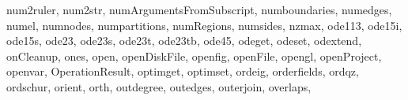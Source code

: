 {{        num2ruler,%
        num2str,%
        numArgumentsFromSubscript,%
        numboundaries,%
        numedges,%
        numel,%
        numnodes,%
        numpartitions,%
        numRegions,%
        numsides,%
        nzmax,%
        ode113,%
        ode15i,%
        ode15s,%
        ode23,%
        ode23s,%
        ode23t,%
        ode23tb,%
        ode45,%
        odeget,%
        odeset,%
        odextend,%
        onCleanup,%
        ones,%
        open,%
        openDiskFile,%
        openfig,%
        openFile,%
        opengl,%
        openProject,%
        openvar,%
        OperationResult,%
        optimget,%
        optimset,%
        ordeig,%
        orderfields,%
        ordqz,%
        ordschur,%
        orient,%
        orth,%
        outdegree,%
        outedges,%
        outerjoin,%
        overlaps,%
}}
